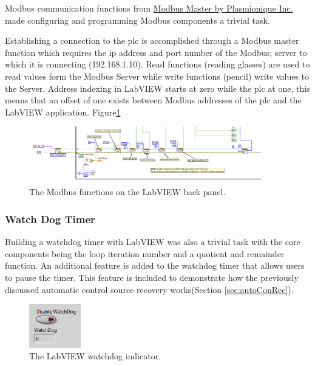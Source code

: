             Modbus communication functions from \href{https://www.ni.com/en-au/support/downloads/tools-network/download.modbus-master.html#374378}{Modbus Master by Plasmionique Inc.} made configuring and programming Modbus components a trivial task\cite{modbusLabview}.
            
            Establishing a connection to the \acrshort{plc} is accomplished through a Modbus master function which requires the \acrshort{ip} address and port number of the Modbus; server to which it is connecting (192.168.1.10). 
            Read functions (reading glasses) are used to read values form the Modbus Server while write functions (pencil) write values to the Server. Address indexing in LabVIEW starts at zero while the \acrshort{plc} at one, this means that an offset of one exists between Modbus addresses of the \acrshort{plc} and the LabVIEW application. Figure\ref{fig:modLabFun}
            
        \begin{figure}[H]
            \centering
            \includegraphics[width = 0.9\textwidth]{2_images/labViewModFunc}
            \caption{The Modbus functions on the LabVIEW back panel.}
            \label{fig:modLabFun}
        \end{figure}     
        
        \subsubsection{Watch Dog Timer}
            Building a watchdog timer with LabVIEW was also a trivial task with the core components being the loop iteration number and a quotient and remainder function. An additional feature is added to the watchdog timer that allows users to pause the timer. This feature is included to demonstrate how the previously discussed automatic control source recovery works(Section \ref{sec:autoConRec}).

        \begin{figure}[H]
            \centering
            \includegraphics[width = 0.2\textwidth]{2_images/labFrontWatchDog}
            \caption{The LabVIEW watchdog indicator.}
            \label{fig:labFrontWatchDog}
        \end{figure}    
            
